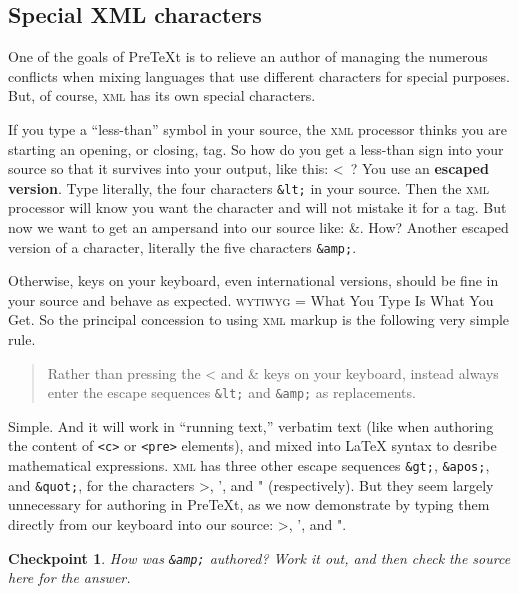 \documentclass[pdflatex]{sn-jnl}
\theoremstyle{thmstyleone}%
\theoremstyle{thmstyletwo}%
\newtheorem{inlineexercise}[theorem]{Checkpoint}
\theoremstyle{thmstylethree}%
\newcommand{\mono}[1]{\texttt{#1}}
\newcommand{\initialism}[1]{\textsc{\MakeLowercase{#1}}}
\DeclareRobustCommand{\initialismintitle}[1]{\texorpdfstring{#1}{#1}}
\newcommand{\terminology}[1]{\textbf{#1}}
\numberwithin{equation}{section}
\begin{document}
\subsection{Special \initialismintitle{XML} characters}\label{subsection-xml-escape}%
One of the goals of PreTeXt is to relieve an author of managing the numerous conflicts when mixing languages that use different characters for special purposes.  But, of course, \initialism{XML} has its own special characters.%
\par
If you type a ``less-than'' symbol in your source, the \initialism{XML} processor thinks you are starting an opening, or closing, tag.  So how do you get a less-than sign into your source so that it survives into your output, like this: \textless{}~?  You use an \terminology{escaped version}.  Type literally, the four characters \mono{\&lt;} in your source.  Then the \initialism{XML} processor will know you want the character and will not mistake it for a tag.  But now we want to get an ampersand into our source like: \&.  How?  Another escaped version of a character, literally the five characters \mono{\&amp;}.%
\par
Otherwise, keys on your keyboard, even international versions, should be fine in your source and behave as expected.  \initialism{WYTIWYG} = What You Type Is What You Get.  So the principal concession to using \initialism{XML} markup is the following very simple rule.%
\begin{quote}%
Rather than pressing the \textless{} and \& keys on your keyboard, instead always enter the escape sequences \mono{\&lt;} and \mono{\&amp;} as replacements.%
\end{quote}
Simple.  And it will work in ``running text,'' verbatim text (like when authoring the content of \mono{<c>} or \mono{<pre>} elements), and mixed into \LaTeX{} syntax to desribe mathematical expressions.  \initialism{XML} has three other escape sequences \mono{\&gt;}, \mono{\&apos;}, and \mono{\&quot;}, for the characters \textgreater{}, ', and " (respectively).  But they seem largely unnecessary for authoring in PreTeXt, as we now demonstrate by typing them directly from our keyboard into our source: \textgreater{}, ', and ".%
\begin{inlineexercise}\label{subsection-xml-escape-7}%
%
How was \mono{\&amp;} authored?  Work it out, and then check the source here for the answer.%
\end{inlineexercise}%
%
%
\typeout{************************************************}
\typeout{************************************************}
%
\end{document}
